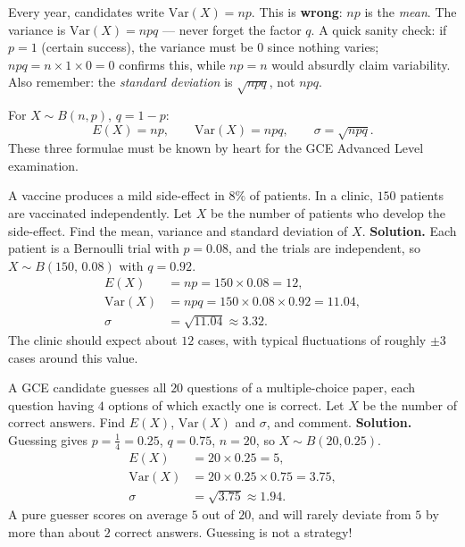\documentclass[11pt]{article}
\begin{document}
\begin{attention}[The classic error: $\mathrm{Var}(X)=np$]
Every year, candidates write $\mathrm{Var}(X)=np$. This is \textbf{wrong}: $np$ is the \emph{mean}. The variance is $\mathrm{Var}(X)=npq$ — never forget the factor $q$. A quick sanity check: if $p=1$ (certain success), the variance must be $0$ since nothing varies; $npq=n\times1\times0=0$ confirms this, while $np=n$ would absurdly claim variability. Also remember: the \emph{standard deviation} is $\sqrt{npq}$, not $npq$.
\end{attention}

\begin{aretenir}
For $X\sim B(n,p)$, $q=1-p$:
\[ E(X)=np,\qquad \mathrm{Var}(X)=npq,\qquad \sigma=\sqrt{npq}. \]
These three formulae must be known by heart for the GCE Advanced Level examination.
\end{aretenir}

\begin{exoresolu}
A vaccine produces a mild side-effect in $8\%$ of patients. In a clinic, $150$ patients are vaccinated independently. Let $X$ be the number of patients who develop the side-effect. Find the mean, variance and standard deviation of $X$.
\tcblower
\textbf{Solution.} Each patient is a Bernoulli trial with $p=0.08$, and the trials are independent, so $X\sim B(150,\,0.08)$ with $q=0.92$.
\begin{align*}
E(X)&=np=150\times0.08=12,\\
\mathrm{Var}(X)&=npq=150\times0.08\times0.92=11.04,\\
\sigma&=\sqrt{11.04}\approx3.32.
\end{align*}
The clinic should expect about $12$ cases, with typical fluctuations of roughly $\pm3$ cases around this value.
\end{exoresolu}

\begin{exoresolu}
A GCE candidate guesses all $20$ questions of a multiple-choice paper, each question having $4$ options of which exactly one is correct. Let $X$ be the number of correct answers. Find $E(X)$, $\mathrm{Var}(X)$ and $\sigma$, and comment.
\tcblower
\textbf{Solution.} Guessing gives $p=\tfrac14=0.25$, $q=0.75$, $n=20$, so $X\sim B(20,0.25)$.
\begin{align*}
E(X)&=20\times0.25=5,\\
\mathrm{Var}(X)&=20\times0.25\times0.75=3.75,\\
\sigma&=\sqrt{3.75}\approx1.94.
\end{align*}
A pure guesser scores on average $5$ out of $20$, and will rarely deviate from $5$ by more than about $2$ correct answers. Guessing is not a strategy!
\end{exoresolu}
\end{document}
